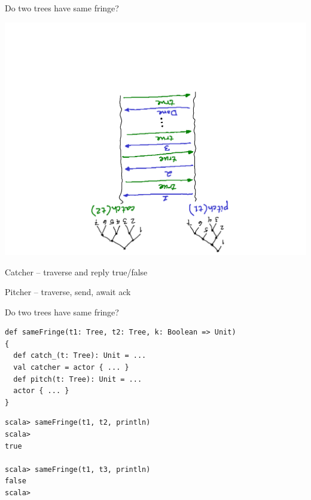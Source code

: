 \documentclass[14pt,t,usepdftitle=false,
xcolornames=x11names,svgnames,dvipsnames]{beamer}
\begin{document}
\begin{frame}[fragile]{Do two trees have same fringe?}
  \vspace{-12mm}
  \begin{center}
    \includegraphics[scale=.45,angle=180]{same-fringe.pdf}
  \end{center}
\end{frame}

\begin{frame}[fragile]{Catcher -- traverse and reply true/false}
  
\end{frame}

\begin{frame}[fragile]{Pitcher -- traverse, send, await ack}
  
\end{frame}

\begin{frame}[fragile]{Do two trees have same fringe?}
  \begin{lstlisting}[style=scala]
def sameFringe(t1: Tree, t2: Tree, k: Boolean => Unit)
{
  def catch_(t: Tree): Unit = ...
  val catcher = actor { ... }
  def pitch(t: Tree): Unit = ...
  actor { ... }
}
  \end{lstlisting}
  \begin{lstlisting}[style=scalarepl]
scala> sameFringe(t1, t2, println)
scala>
true

scala> sameFringe(t1, t3, println)
false
scala>
  \end{lstlisting}
\end{frame}
\end{document}
